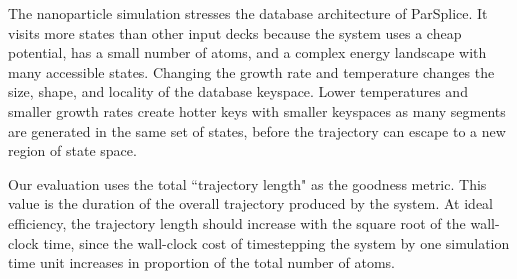 The nanoparticle simulation stresses the database architecture of ParSplice. It
visits more states than other input decks because the system uses a cheap
potential, has a small number of atoms, and a complex energy landscape with
many accessible states. Changing the growth rate and temperature changes the
size, shape, and locality of the database keyspace. Lower temperatures and
smaller growth rates create hotter keys with smaller keyspaces as many segments
are generated in the same set of states, before the trajectory can escape to a
new region of state space.

Our evaluation uses the total ``trajectory length" as the goodness metric. This
value is the duration of the overall trajectory produced by the system. At
ideal efficiency, the trajectory length should increase with the square root of
the wall-clock time, since the wall-clock cost of timestepping the system by
one simulation time unit increases in proportion of the total number of atoms.

